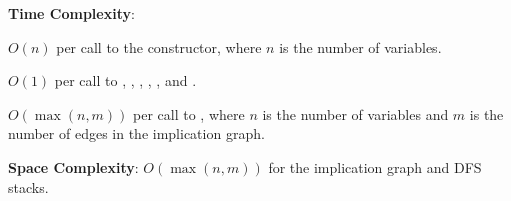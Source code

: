 \textbf{Time Complexity}:
\begin{compactitem}
  \item $O(n)$ per call to the constructor, where $n$ is the number of variables.
  \item $O(1)$ per call to , , , , , and .
  \item $O(\max\left(n, m\right))$ per call to , where $n$ is the number of variables and $m$ is the number of edges in the implication graph.
\end{compactitem}

\textbf{Space Complexity}: $O(\max\left(n, m\right))$ for the implication graph and DFS stacks.

